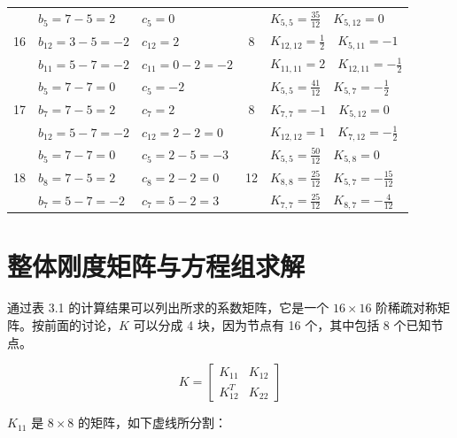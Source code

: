 \documentclass[a4paper, 12pt]{article}
\begin{document}
\begin{longtable}{|c|l|l|c|l|}
\multirow{3}{*}{16} & $b_5=7-5=2$ & $c_5=0$ & \multirow{3}{*}{8} & $K_{5,5}=\frac{35}{12} \quad K_{5,12}=0$ \\
 & $b_{12}=3-5=-2$ & $c_{12}=2$ & & $K_{12,12}=\frac{1}{2} \quad K_{5,11} = -1$ \\
 & $b_{11}=5-7=-2$ & $c_{11}=0-2=-2$ & & $K_{11,11}=2 \quad K_{12,11} = -\frac{1}{2}$ \\
\hline

\multirow{3}{*}{17} & $b_5=7-7=0$ & $c_5=-2$ & \multirow{3}{*}{8} & $K_{5,5}=\frac{41}{12} \quad K_{5,7} = -\frac{1}{2}$ \\
 & $b_7=7-5=2$ & $c_7=2$ & & $K_{7,7}=-1 \quad K_{5,12}=0$ \\
 & $b_{12}=5-7=-2$ & $c_{12}=2-2=0$ & & $K_{12,12}=1 \quad K_{7,12} = -\frac{1}{2}$ \\
\hline

\multirow{3}{*}{18} & $b_5=7-7=0$ & $c_5=2-5=-3$ & \multirow{3}{*}{12} & $K_{5,5}=\frac{50}{12} \quad K_{5,8}=0$ \\
 & $b_8=7-5=2$ & $c_8=2-2=0$ & & $K_{8,8}=\frac{25}{12} \quad K_{5,7} = -\frac{15}{12}$ \\
 & $b_7=5-7=-2$ & $c_7=5-2=3$ & & $K_{7,7}=\frac{25}{12} \quad K_{8,7} = -\frac{4}{12}$ \\
\hline
\end{longtable}

\section{整体刚度矩阵与方程组求解}

通过表 3.1 的计算结果可以列出所求的系数矩阵，它是一个 $16 \times 16$ 阶稀疏对称矩阵。按前面的讨论，$K$ 可以分成 4 块，因为节点有 16 个，其中包括 8 个已知节点。

\[
K = \begin{bmatrix} K_{11} & K_{12} \\ K_{12}^T & K_{22} \end{bmatrix}
\]

$K_{11}$ 是 $8 \times 8$ 的矩阵，如下虚线所分割：
\end{document}
